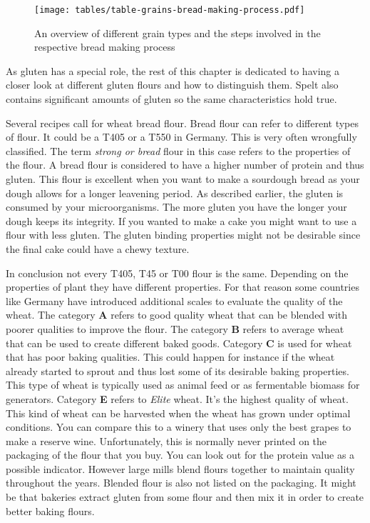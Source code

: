 \begin{figure}[!htb]
  \texttt{[image: tables/table-grains-bread-making-process.pdf]}
  \caption{An overview of different grain types and the steps involved in the respective bread making process}
\end{figure}

As gluten has a special role, the rest of this chapter is dedicated to having a
closer look at different gluten flours and how to distinguish them. Spelt
also contains significant amounts of gluten so the same characteristics hold
true.

Several recipes call for wheat bread flour. Bread flour can refer to different types
of flour. It could be a T405 or a T550 in Germany. This is very often
wrongfully classified. The term  \textit{strong or bread} flour in this case
refers to the properties of the flour. A bread flour is considered to have a
higher number of protein and thus gluten. This flour is excellent when you
want to make a sourdough bread as your dough allows for a longer leavening
period. As described earlier, the gluten is consumed by your microorganisms.
The more gluten you have the longer your dough keeps its integrity. If you wanted
to make a cake you might want to use a flour with less gluten. The gluten binding
properties might not be desirable since the final cake could have a chewy texture.

In conclusion not every T405, T45 or T00 flour is the same. Depending on the properties
of plant they have different properties. For that reason some countries like
Germany have introduced additional scales to evaluate the quality of the
wheat. The category \textbf{A} refers to good quality wheat that can be blended
with poorer qualities to improve the flour. The category \textbf{B} refers to
average wheat that can be used to create different baked goods. Category \textbf{C}
is used for wheat that has poor baking qualities. This could happen for instance
if the wheat already started to sprout and thus lost some of its desirable
baking properties. This type of wheat is typically used as animal feed or
as fermentable biomass for generators. Category \textbf{E} refers to \textit{Elite} wheat. It's
the highest quality of wheat. This kind of wheat can be harvested when the
wheat has grown under optimal conditions. You can compare this to a winery
that uses only the best grapes to make a reserve wine. Unfortunately, this is normally never printed
on the packaging of the flour that you buy. You can look out for the protein
value as a possible indicator. However large mills blend flours together to
maintain quality throughout the years. Blended flour is also not listed on
the packaging. It might be that bakeries extract gluten from some flour and
then mix it in order to create better baking flours.

